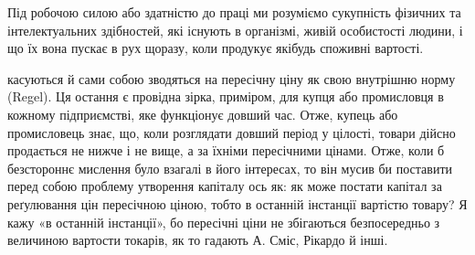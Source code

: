 Під робочою силою або здатністю до праці ми розуміємо
сукупність фізичних та інтелектуальних здібностей, які існують
в організмі, живій особистості людини, і що їх вона пускає в рух
щоразу, коли продукує якібудь споживні вартості.

касуються й сами собою зводяться на пересічну ціну як свою внутрішню
норму (Regel). Ця остання є провідна зірка, приміром, для купця або
промисловця в кожному підприємстві, яке функціонує довший час. Отже,
купець або промисловець знає, що, коли розглядати довший період у
цілості, товари дійсно продається не нижче і не вище, а за їхніми пересічними
цінами. Отже, коли б безстороннє мислення було взагалі в його інтересах,
то він мусив би поставити перед собою проблему утворення капіталу
ось як: як може постати капітал за реґулювання цін пересічною ціною,
тобто в останній інстанції вартістю товару? Я кажу «в останній інстанції»,
бо пересічні ціни не збігаються безпосередньо з величиною вартости токарів,
як то гадають А. Сміс, Рікардо й інші.

